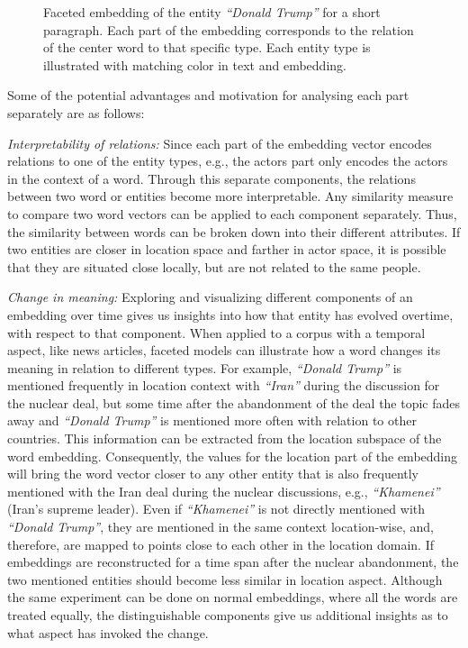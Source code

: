 \begin{figure}
\centering 
\resizebox{0.97\textwidth}{0.3\textwidth}{      

}
\caption{Faceted embedding of the entity \emph{``Donald Trump''} for a short paragraph. Each part of the embedding corresponds to the relation of the center word to that specific type. Each entity type is illustrated with matching color in text and embedding. }
\label{fig:faceted_emb}
\end{figure} 
\noindent
Some of the potential advantages and motivation for analysing each part separately are as follows: 
\begin{compactitem}
\item \emph{Interpretability of relations:} Since each part of the embedding vector encodes relations to one of the entity types, e.g., the actors part only encodes the actors in the context of a word. Through this separate components, the relations between two word or entities become more interpretable. Any similarity measure to compare two word vectors can be applied to each component separately. Thus, the similarity between words can be broken down into their different attributes. If two entities are closer in location space and farther in actor space, it is possible that they are situated close locally, but are not related to the same people. \\

\item \emph{Change in meaning:} Exploring and visualizing different components of an embedding over time gives us insights into how that entity has evolved overtime, with respect to that component. When applied to a corpus with a temporal aspect, like news articles, faceted models can illustrate how a word changes its meaning in relation to different types. For example, \emph{``Donald Trump''} is mentioned frequently in location context with \emph{``Iran''} during the discussion for the nuclear deal, but some time after the abandonment of the deal the topic fades away and \emph{``Donald Trump''}  is mentioned more often with relation to other countries. This information can be extracted from the location subspace of the word embedding. Consequently, the values for the location part of the embedding will bring the word vector closer to any other entity that is also frequently mentioned with the Iran deal during the nuclear discussions, e.g., \emph{``Khamenei''} (Iran's supreme leader). Even if \emph{``Khamenei''} is not directly mentioned with \emph{``Donald Trump''}, they are mentioned in the same context location-wise, and, therefore, are mapped to points close to each other in the location domain. If embeddings are reconstructed for a time span after the nuclear abandonment, the two mentioned entities should become less similar in location aspect. Although the same experiment can be done on normal embeddings, where all the words are treated equally, the distinguishable components give us additional insights as to what aspect has invoked the change.\\


\end{compactitem}
